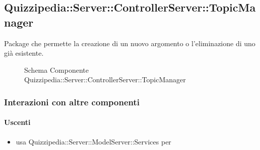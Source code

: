 \subsection{Quizzipedia::Server::ControllerServer::TopicManager}
Package che permette la creazione di un nuovo argomento o l'eliminazione di uno già esistente.
\begin{figure}[H]
\centering
\noindent{}
\caption[Schema Componente Quizzipedia::Server::ControllerServer::TopicManager]{Schema Componente Quizzipedia::Server::ControllerServer::TopicManager}
\end{figure}
\subsubsection{Interazioni con altre componenti}
\paragraph{Uscenti}
\begin{itemize}
\item usa Quizzipedia::Server::ModelServer::Services per 
\end{itemize}

